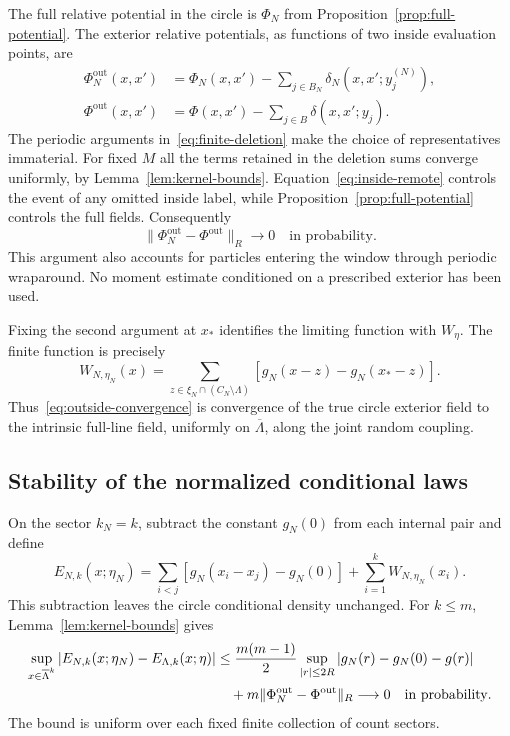 \documentclass[11pt]{article}
\theoremstyle{remark}\newtheorem{remark}[theorem]{Remark}
\begin{document}
The full relative potential in the circle is $\Phi_N$ from
Proposition~\ref{prop:full-potential}. The exterior relative
potentials, as functions of two inside evaluation points, are
\begin{align}
 \Phi_N^{\mathrm{out}}(x,x')
   &=\Phi_N(x,x')-
       \sum_{j\in B_N}\delta_N(x,x';y_j^{(N)}),
                    \label{eq:finite-deletion}\\
 \Phi^{\mathrm{out}}(x,x')
   &=\Phi(x,x')-
       \sum_{j\in B}\delta(x,x';y_j).
                    \label{eq:limit-deletion}
\end{align}
The periodic arguments in~\eqref{eq:finite-deletion} make the
choice of representatives immaterial. For fixed $M$ all the
terms retained in the deletion sums converge uniformly, by
Lemma~\ref{lem:kernel-bounds}. Equation~\eqref{eq:inside-remote}
controls the event of any omitted inside label, while
Proposition~\ref{prop:full-potential} controls the full fields.
Consequently
\begin{equation}\label{eq:outside-convergence}
 \|\Phi_N^{\mathrm{out}}-\Phi^{\mathrm{out}}\|_R
                  \longrightarrow0
                  \quad\text{in probability}.
\end{equation}
This argument also accounts for particles entering the window
through periodic wraparound. No moment estimate conditioned on
a prescribed exterior has been used.

Fixing the second argument at $x_*$ identifies the limiting
function with $W_\eta$. The finite function is precisely
\begin{equation}\label{eq:finite-exterior-potential}
 W_{N,\eta_N}(x)=
   \sum_{z\in\xi_N\cap(C_N\setminus\Lambda)}
          [g_N(x-z)-g_N(x_*-z)].
\end{equation}
Thus~\eqref{eq:outside-convergence} is convergence of the true
circle exterior field to the intrinsic full-line field, uniformly
on $\overline\Lambda$, along the joint random coupling.

\subsection{Stability of the normalized conditional laws}

On the sector $k_N=k$, subtract the constant $g_N(0)$ from each
internal pair and define
\begin{equation}\label{eq:finite-energy}
 E_{N,k}(x;\eta_N)
    =\sum_{i<j}[g_N(x_i-x_j)-g_N(0)]
                   +\sum_{i=1}^kW_{N,\eta_N}(x_i).
\end{equation}
This subtraction leaves the circle conditional density unchanged.
For $k\le m$, Lemma~\ref{lem:kernel-bounds} gives
\begin{align}
 \sup_{x\in\overline\Lambda^k}
 |E_{N,k}(x;\eta_N)-E_{\Lambda,k}(x;\eta)|
 &\le \frac{m(m-1)}2
   \sup_{|r|\le2R}|g_N(r)-g_N(0)-g(r)|\notag\\
 &\quad+m\|\Phi_N^{\mathrm{out}}-
                       \Phi^{\mathrm{out}}\|_R
 \longrightarrow0
 \quad\text{in probability}.
                    \label{eq:energy-convergence}
\end{align}
The bound is uniform over each fixed finite collection of count
sectors.
\end{document}

